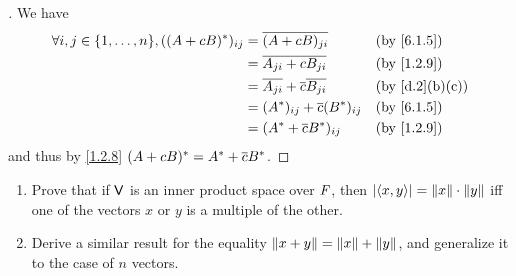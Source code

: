 \begin{proof}[]
  We have
  \begin{align*}
    \forall i, j \in \set{1, \dots, n}, ((A + cB)^*)_{i j} & = \conj{(A + cB)_{j i}}                    &  & \text{(by \cref{6.1.5})}     \\
                                                           & = \conj{A_{j i} + c B_{j i}}               &  & \text{(by \cref{1.2.9})}     \\
                                                           & = \conj{A_{j i}} + \conj{c} \conj{B_{j i}} &  & \text{(by \cref{d.2}(b)(c))} \\
                                                           & = (A^*)_{i j} + \conj{c} (B^*)_{i j}       &  & \text{(by \cref{6.1.5})}     \\
                                                           & = (A^* + \conj{c} B^*)_{i j}               &  & \text{(by \cref{1.2.9})}
  \end{align*}
  and thus by \cref{1.2.8} \((A + cB)^* = A^* + \overline{c} B^*\).
\end{proof}

\begin{ex}\label{ex:6.1.15}
  \begin{enumerate}
    \item Prove that if \(\mathsf{V}\) is an inner product space over \(\mathit{F}\), then \(\left\lvert\left\langle x, y\right\rangle\right\rvert = \left\lVert x\right\rVert \cdot \left\lVert y\right\rVert\) iff one of the vectors \(x\) or \(y\) is a multiple of the other.
    \item Derive a similar result for the equality \(\left\lVert x + y\right\rVert = \left\lVert x\right\rVert + \left\lVert y\right\rVert\), and generalize it to the case of \(n\) vectors.
  \end{enumerate}
\end{ex}

